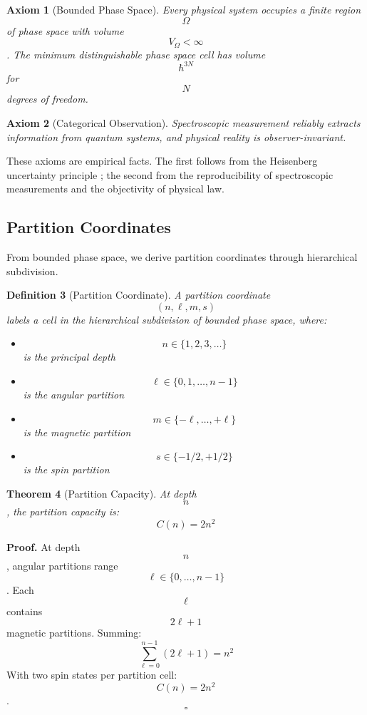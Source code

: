 \documentclass[twocolumn,10pt]{article}
\newtheorem{theorem}{Theorem}[section]
\newtheorem{definition}[theorem]{Definition}
\newtheorem{axiom}[theorem]{Axiom}
\begin{document}
\begin{axiom}[Bounded Phase Space]
Every physical system occupies a finite region $$\Omega$$ of phase space with volume $$V_\Omega < \infty$$. The minimum distinguishable phase space cell has volume $$\hbar^{3N}$$ for $$N$$ degrees of freedom.
\end{axiom}

\begin{axiom}[Categorical Observation]
Spectroscopic measurement reliably extracts information from quantum systems, and physical reality is observer-invariant.
\end{axiom}

These axioms are empirical facts. The first follows from the Heisenberg uncertainty principle \cite{Heisenberg1927}; the second from the reproducibility of spectroscopic measurements and the objectivity of physical law.

\subsection{Partition Coordinates}

From bounded phase space, we derive partition coordinates through hierarchical subdivision.

\begin{definition}[Partition Coordinate]
A partition coordinate $$(n, \ell, m, s)$$ labels a cell in the hierarchical subdivision of bounded phase space, where:
\begin{itemize}
\item $$n \in \{1, 2, 3, \ldots\}$$ is the principal depth
\item $$\ell \in \{0, 1, \ldots, n-1\}$$ is the angular partition
\item $$m \in \{-\ell, \ldots, +\ell\}$$ is the magnetic partition
\item $$s \in \{-1/2, +1/2\}$$ is the spin partition
\end{itemize}
\end{definition}

\begin{theorem}[Partition Capacity]
At depth $$n$$, the partition capacity is:
\begin{equation}
C(n) = 2n^2
\end{equation}
\end{theorem}

\textbf{Proof.} At depth $$n$$, angular partitions range $$\ell \in \{0, \ldots, n-1\}$$. Each $$\ell$$ contains $$2\ell + 1$$ magnetic partitions. Summing:
\begin{equation}
\sum_{\ell=0}^{n-1} (2\ell + 1) = n^2
\end{equation}
With two spin states per partition cell: $$C(n) = 2n^2$$. \hfill $$\square$$
\end{document}

